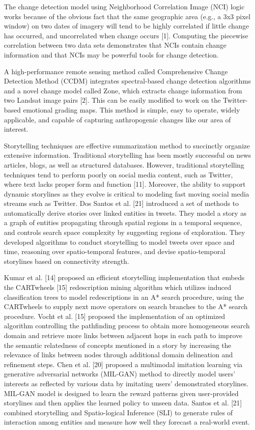 \documentclass[conference]{IEEEtran}
\begin{document}
The change detection model using Neighborhood Correlation Image (NCI) logic works because of the obvious fact that the same geographic area (e.g., a 3x3 pixel window) on two dates of imagery will tend to be highly correlated if little change has occurred, and uncorrelated when change occurs [1]. Computing the piecewise correlation between two data sets demonstrates that NCIs contain change information and that NCIs may be powerful tools for change detection.

A high-performance remote sensing method called Comprehensive Change Detection Method (CCDM) integrates spectral-based change detection algorithms and a novel change model called Zone, which extracts change information from two Landsat image pairs [2]. This can be easily modified to work on the Twitter-based emotional grading maps. This method is simple, easy to operate, widely applicable, and capable of capturing anthropogenic changes like our area of interest.

Storytelling techniques are effective summarization method to succinctly organize extensive information. Traditional storytelling has been mostly successful on news articles, blogs, as well as structured databases. However, traditional storytelling techniques tend to perform poorly on social media content, such as Twitter, where text lacks proper form and function [11]. Moreover, the ability to support dynamic storylines as they evolve is critical to modeling fast moving social media streams such as Twitter. Dos Santos et al. [21] introduced a set of methods to automatically derive stories over linked entities in tweets. They model a story as a graph of entities propagating through spatial regions in a temporal sequence, and controls search space complexity by suggesting regions of exploration. They developed algorithms to conduct storytelling to model tweets over space and time, reasoning over spatio-temporal features, and devise spatio-temporal storylines based on connectivity strength.

Kumar et al. [14] proposed an efficient storytelling implementation that embeds the CARTwheels [15] redescription mining algorithm which utilizes induced classification trees to model redescriptions in an A* search procedure, using the CARTwheels to supply next move operators on search branches to the A* search procedure. Vocht et al. [15] proposed the implementation of an optimized algorithm controlling the pathfinding process to obtain more homogeneous search domain and retrieve more links between adjacent hops in each path to improve the semantic relatedness of concepts mentioned in a story by increasing the relevance of links between nodes through additional domain delineation and refinement steps. Chen et al. [20] proposed a multimodal imitation learning via generative adversarial networks (MIL-GAN) method to directly model users' interests as reflected by various data by imitating users' demonstrated storylines. MIL-GAN model is designed to learn the reward patterns given user-provided storylines and then applies the learned policy to unseen data. Santos et al. [21] combined storytelling and Spatio-logical Inference (SLI) to generate rules of interaction among entities and measure how well they forecast a real-world event. 
\end{document}
